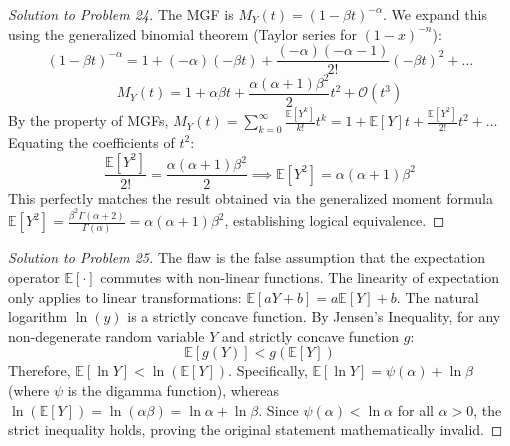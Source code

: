 \documentclass[11pt, a4paper]{article}
\theoremstyle{definition}
\theoremstyle{remark}
\newcommand{\E}{\mathbb{E}}
\begin{document}
\begin{proof}[Solution to Problem 24]
The MGF is $M_Y(t) = (1 - \beta t)^{-\alpha}$.
We expand this using the generalized binomial theorem (Taylor series for $(1-x)^{-n}$):
\[ (1 - \beta t)^{-\alpha} = 1 + (-\alpha)(-\beta t) + \frac{(-\alpha)(-\alpha-1)}{2!} (-\beta t)^2 + \dots \]
\[ M_Y(t) = 1 + \alpha\beta t + \frac{\alpha(\alpha+1)\beta^2}{2} t^2 + \mathcal{O}(t^3) \]
By the property of MGFs, $M_Y(t) = \sum_{k=0}^\infty \frac{\E[Y^k]}{k!} t^k = 1 + \E[Y]t + \frac{\E[Y^2]}{2!} t^2 + \dots$
Equating the coefficients of $t^2$:
\[ \frac{\E[Y^2]}{2!} = \frac{\alpha(\alpha+1)\beta^2}{2} \implies \E[Y^2] = \alpha(\alpha+1)\beta^2 \]
This perfectly matches the result obtained via the generalized moment formula $\E[Y^2] = \frac{\beta^2\Gamma(\alpha+2)}{\Gamma(\alpha)} = \alpha(\alpha+1)\beta^2$, establishing logical equivalence.
\end{proof}

\begin{proof}[Solution to Problem 25]
The flaw is the false assumption that the expectation operator $\E[\cdot]$ commutes with non-linear functions. The linearity of expectation only applies to linear transformations: $\E[aY + b] = a\E[Y] + b$. The natural logarithm $\ln(y)$ is a strictly concave function.
By Jensen's Inequality, for any non-degenerate random variable $Y$ and strictly concave function $g$:
\[ \E[g(Y)] < g(\E[Y]) \]
Therefore, $\E[\ln Y] < \ln(\E[Y])$.
Specifically, $\E[\ln Y] = \psi(\alpha) + \ln \beta$ (where $\psi$ is the digamma function), whereas $\ln(\E[Y]) = \ln(\alpha\beta) = \ln \alpha + \ln \beta$. Since $\psi(\alpha) < \ln \alpha$ for all $\alpha > 0$, the strict inequality holds, proving the original statement mathematically invalid.
\end{proof}
\end{document}
